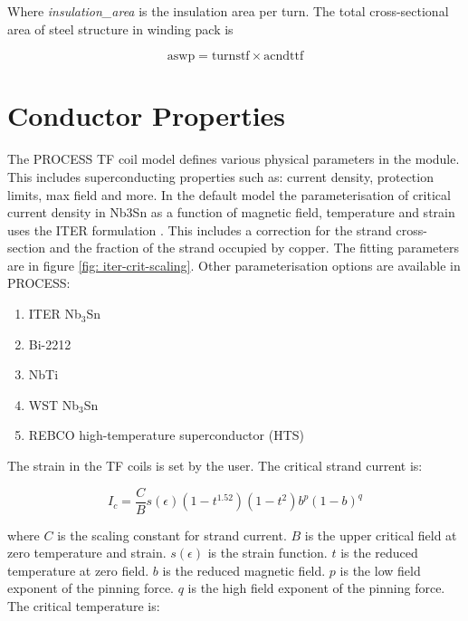 \documentclass[hidelinks]{article}
\numberwithin{equation}{section}
\begin{document}
    \noi Where \emph{insulation\_area} is the insulation area per turn. The total cross-sectional 
    area of steel structure in winding pack is

    \begin{equation}
        \text{aswp} = \text{turnstf} \times \text{acndttf}
    \end{equation}
    
    \section{Conductor Properties}

    The PROCESS TF coil model defines various physical parameters in the module. This 
    includes superconducting properties such as: current density, protection limits, 
    max field and more. In the default model the parameterisation of critical current 
    density in Nb3Sn as a function of magnetic field, temperature and strain uses the 
    ITER formulation \cite{Bottura2009}. This includes a correction for the strand 
    cross-section and the fraction of the strand occupied by copper. The fitting 
    parameters are in figure \ref{fig: iter-crit-scaling}. Other parameterisation 
    options are available in PROCESS:
    
    \begin{enumerate}
        \item ITER Nb$_3$Sn
        \item Bi-2212
        \item NbTi
        \item WST Nb$_3$Sn
        \item REBCO high-temperature superconductor (HTS)
    \end{enumerate}
    
    \noi The strain in the TF coils is set by the user. The critical strand current is:

    \begin{equation}\label{eq: strand-crit-current}
        I_c = \frac{C}{B}s(\epsilon)(1-t^{1.52})(1-t^2)b^p(1-b)^q
    \end{equation}

    \noi where $C$ is the scaling constant for strand current. $B$ is the upper 
    critical field at zero temperature and strain. $s(\epsilon)$ is the strain 
    function. $t$ is the reduced temperature at zero field. $b$ is the reduced 
    magnetic field. $p$ is the low field exponent of the pinning force. $q$ is 
    the high field exponent of the pinning force. The critical temperature is:
\end{document}
